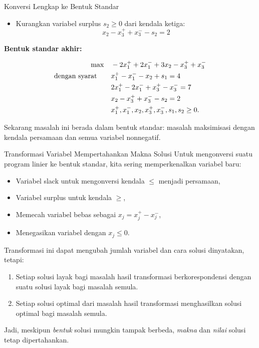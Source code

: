 \begin{example}{Konversi Lengkap ke Bentuk Standar}
\begin{itemize}
    \item Kurangkan variabel surplus \( s_2 \geq 0 \) dari kendala ketiga:
    \[
    x_2 - x_3^+ + x_3^- - s_2 = 2
    \]
\end{itemize}

\medskip
\textbf{Bentuk standar akhir:}

\[
\begin{aligned}
\max \quad & -2x_1^+ + 2x_1^- + 3x_2 - x_3^+ + x_3^- \\
\mbox{dengan syarat}\quad \quad 
& x_1^+ - x_1^- - x_2 + s_1 = 4 \\
& 2x_1^+ - 2x_1^- + x_3^+ - x_3^- = 7 \\
& x_2 - x_3^+ + x_3^- - s_2 = 2 \\
& x_1^+, x_1^-, x_2, x_3^+, x_3^-, s_1, s_2 \geq 0.
\end{aligned}
\]

Sekarang masalah ini berada dalam bentuk standar: masalah maksimisasi dengan kendala persamaan dan semua variabel nonnegatif.
\end{example}

\begin{remark}{Transformasi Variabel Mempertahankan Makna Solusi}{}
Untuk mengonversi suatu program linier ke bentuk standar, kita sering memperkenalkan variabel baru:
\begin{itemize}
    \item Variabel slack untuk mengonversi kendala \( \leq \) menjadi persamaan,
    \item Variabel surplus untuk kendala \( \geq \),
    \item Memecah variabel bebas sebagai \( x_j = x_j^+ - x_j^- \),
    \item Menegasikan variabel dengan \( x_j \leq 0 \).
\end{itemize}

Transformasi ini dapat mengubah jumlah variabel dan cara solusi dinyatakan, tetapi:
\begin{enumerate}
    \item Setiap solusi layak bagi masalah hasil transformasi berkorespondensi dengan suatu solusi layak bagi masalah semula.
    \item Setiap solusi optimal dari masalah hasil transformasi menghasilkan solusi optimal bagi masalah semula.
\end{enumerate}

Jadi, meskipun \emph{bentuk} solusi mungkin tampak berbeda, \emph{makna} dan \emph{nilai} solusi tetap dipertahankan.
\end{remark}

